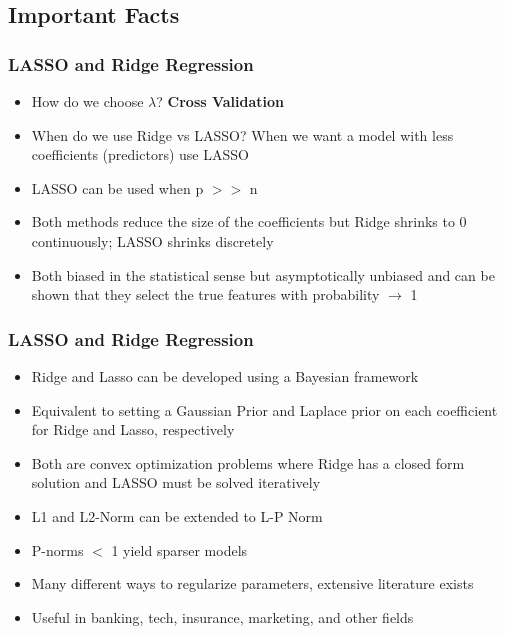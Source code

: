 \documentclass[]{beamer}
\begin{document}
\subsection{Important Facts}
\begin{frame}
\frametitle{LASSO and Ridge Regression}   %
\begin{itemize}
\item<1-> How do we choose $\lambda$? \bf{Cross Validation}
\item<2-> When do we use Ridge vs LASSO? When we want a model with less coefficients (predictors) use LASSO
\item<3-> LASSO can be used when p $>>$ n 
\item<4-> Both methods reduce the size of the coefficients but Ridge shrinks to 0 continuously; LASSO shrinks discretely
\item<5-> Both biased in the statistical sense but asymptotically unbiased and can be shown that they select the true features with probability $\rightarrow$  1
\end{itemize}
\end{frame}

\begin{frame}
\frametitle{LASSO and Ridge Regression}   %
\begin{itemize}
\item<1-> Ridge and Lasso can be developed using a Bayesian framework
\item<2-> Equivalent to setting a Gaussian Prior and Laplace prior on each coefficient for Ridge and Lasso, respectively
\item<3-> Both are convex optimization problems where Ridge has a closed form solution and LASSO must be solved iteratively
\item<4-> L1 and L2-Norm can be extended to L-P Norm
\item<5-> P-norms $<$ 1 yield sparser models
\item<6-> Many different ways to regularize parameters, extensive literature exists
\item<7-> Useful in banking, tech, insurance, marketing, and other fields
\end{itemize}
\end{frame}

\end{document}
